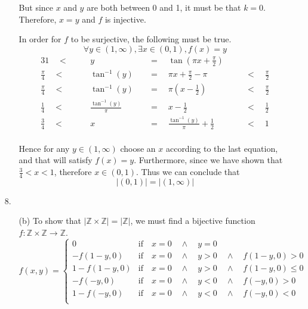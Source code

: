\documentclass[fleqn]{article}
\begin{document}
\begin{enumerate}
\begin{enumerate}
		But since \(x\) and \(y\) are both between 0 and 1, it must be that \(k = 0\). Therefore, \(x = y\) and \(f\) is injective.

		In order for \(f\) to be surjective, the following must be true.
		\[\forall y \in (1, \infty), \exists x \in (0, 1), f(x) = y\]
		\begin{alignat*}{3}
			1 \quad < \quad & & y \quad &= \quad \tan\left(\pi x + \frac{\pi}{2}\right) \\
			\frac{\pi}{4} \quad < \quad&	& \tan^{-1}(y) \quad &= \quad \pi x + \frac{\pi}{2} - \pi & &\quad < \quad \frac{\pi}{2} \\
			\frac{\pi}{4} \quad < \quad&	& \tan^{-1}(y) \quad &= \quad \pi \left(x - \frac{1}{2}\right)	& &\quad < \quad \frac{\pi}{2} \\
			\frac{1}{4} \quad < \quad&	& \frac{\tan^{-1}(y)}{\pi} \quad &= \quad x - \frac{1}{2} & &\quad < \quad \frac{1}{2} \\
			\frac{3}{4} \quad < \quad&	& x \quad &= \quad \frac{\tan^{-1}(y)}{\pi} + \frac{1}{2} & &\quad < \quad 1 \\
		\end{alignat*}
		
		Hence for any \(y \in (1, \infty)\) choose an \(x\) according to the last equation, and that will satisfy \(f(x) = y\). Furthermore, since we have shown that \(\frac{3}{4} < x < 1\), therefore \(x \in (0, 1)\). Thus we can conclude that 
		\[|(0, 1)| = |(1, \infty)|\]
	\end{enumerate}

	\item[8.]
	\begin{enumerate}
		\item[(b)]
		To show that \(|\mathbb{Z} \times \mathbb{Z}| = |\mathbb{Z}|\), we must find a bijective function \(f : \mathbb{Z} \times \mathbb{Z} \to \mathbb{Z}\).
		\[f(x, y) = 
		\begin{cases}
			0					& \text{if} \quad x = 0 \quad \land \quad y = 0 \\

			-f(1 - y, 0)		& \text{if} \quad x = 0 \quad \land \quad y > 0 \quad \land \quad f(1 - y, 0) > 0 \\
			1 - f(1 - y, 0)		& \text{if} \quad x = 0 \quad \land \quad y > 0 \quad \land \quad f(1 - y, 0) \leq 0 \\
			-f(-y, 0)			& \text{if} \quad x = 0 \quad \land \quad y < 0 \quad \land \quad f(-y, 0) > 0 \\
			1 - f(-y, 0)		& \text{if} \quad x = 0 \quad \land \quad y < 0 \quad \land \quad f(-y, 0) < 0 \\


\end{cases}\]
\end{enumerate}
\end{enumerate}
\end{document}
